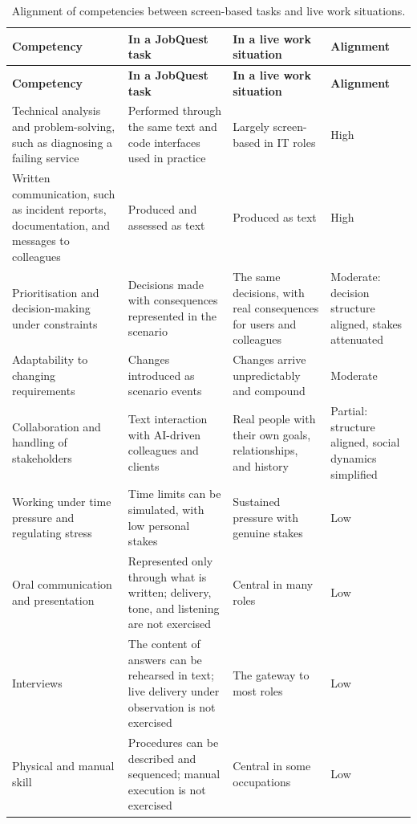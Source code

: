 {\small
\begin{longtable}{|>{\raggedright\arraybackslash}p{}|>{\raggedright\arraybackslash}p{}|>{\raggedright\arraybackslash}p{}|>{\raggedright\arraybackslash}p{}|}
\caption{Alignment of competencies between screen-based tasks and live work situations.} \\
\hline
\textbf{Competency} & \textbf{In a JobQuest task} & \textbf{In a live work situation} & \textbf{Alignment} \\ \hline
\endfirsthead
\hline
\textbf{Competency} & \textbf{In a JobQuest task} & \textbf{In a live work situation} & \textbf{Alignment} \\ \hline
\endhead
Technical analysis and problem-solving, such as diagnosing a failing service & Performed through the same text and code interfaces used in practice & Largely screen-based in IT roles & High \\ \hline
Written communication, such as incident reports, documentation, and messages to colleagues & Produced and assessed as text & Produced as text & High \\ \hline
Prioritisation and decision-making under constraints & Decisions made with consequences represented in the scenario & The same decisions, with real consequences for users and colleagues & Moderate: decision structure aligned, stakes attenuated \\ \hline
Adaptability to changing requirements & Changes introduced as scenario events & Changes arrive unpredictably and compound & Moderate \\ \hline
Collaboration and handling of stakeholders & Text interaction with AI-driven colleagues and clients & Real people with their own goals, relationships, and history & Partial: structure aligned, social dynamics simplified \\ \hline
Working under time pressure and regulating stress & Time limits can be simulated, with low personal stakes & Sustained pressure with genuine stakes & Low \\ \hline
Oral communication and presentation & Represented only through what is written; delivery, tone, and listening are not exercised & Central in many roles & Low \\ \hline
Interviews & The content of answers can be rehearsed in text; live delivery under observation is not exercised & The gateway to most roles & Low \\ \hline
Physical and manual skill & Procedures can be described and sequenced; manual execution is not exercised & Central in some occupations & Low \\ \hline
\end{longtable}
}

